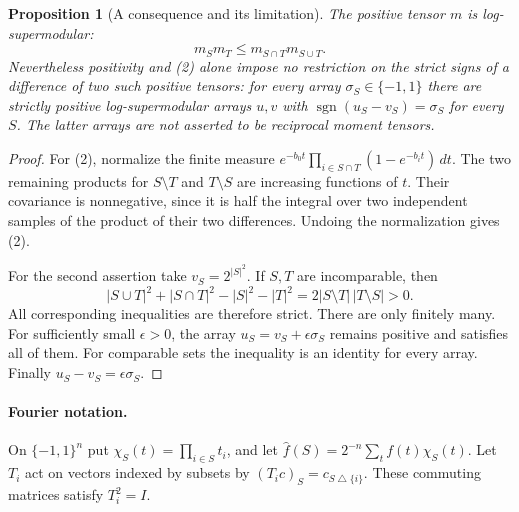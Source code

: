 \documentclass[11pt]{article}
\newtheorem{proposition}{Proposition}
\begin{document}
\begin{proposition}[A consequence and its limitation]
The positive tensor $m$ is log-supermodular:
\[
             m_Sm_T\leq m_{S\cap T}m_{S\cup T}.              \tag{2}
\]
Nevertheless positivity and (2) alone impose no restriction on the
strict signs of a difference of two such positive tensors: for every
array $\sigma_S\in\{-1,1\}$ there are strictly positive
log-supermodular arrays $u,v$ with
$\operatorname{sgn}(u_S-v_S)=\sigma_S$ for every $S$.
The latter arrays are not asserted to be reciprocal moment tensors.
\end{proposition}
\begin{proof}
For (2), normalize the finite measure
$e^{-b_0t}\prod_{i\in S\cap T}(1-e^{-b_it})\,dt$. The two remaining
products for $S\setminus T$ and $T\setminus S$ are increasing
functions of $t$. Their covariance is nonnegative, since it is half
the integral over two independent samples of the product of their
two differences. Undoing the normalization gives (2).

For the second assertion take $v_S=2^{|S|^2}$. If $S,T$ are
incomparable, then
\[
 |S\cup T|^2+|S\cap T|^2-|S|^2-|T|^2
                 =2|S\setminus T|\,|T\setminus S|>0.
\]
All corresponding inequalities are therefore strict. There are only
finitely many. For sufficiently small $\epsilon>0$, the array
$u_S=v_S+\epsilon\sigma_S$ remains positive and satisfies all of
them. For comparable sets the inequality is an identity for every
array. Finally $u_S-v_S=\epsilon\sigma_S$.
\end{proof}

\paragraph{Fourier notation.}
On $\{-1,1\}^n$ put $\chi_S(t)=\prod_{i\in S}t_i$, and let
$\widehat f(S)=2^{-n}\sum_t f(t)\chi_S(t)$. Let $T_i$ act on
vectors indexed by subsets by $(T_ic)_S=c_{S\mathbin\triangle\{i\}}$.
These commuting matrices satisfy $T_i^2=I$.
\end{document}

